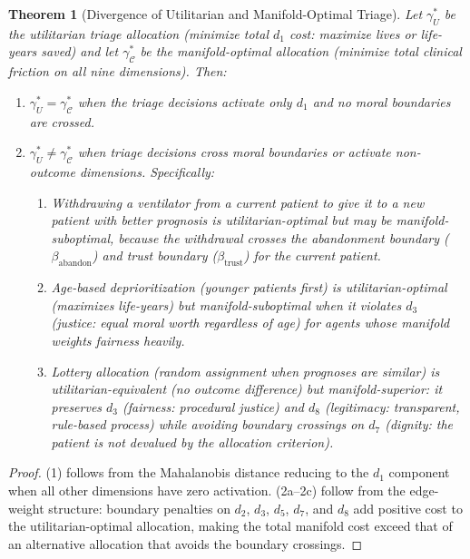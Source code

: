 \documentclass[12pt]{article}
\newtheorem{theorem}{Theorem}[section]
\theoremstyle{definition}
\theoremstyle{remark}
\newcommand{\C}{\mathcal{C}}               %
\begin{document}
\begin{theorem}[Divergence of Utilitarian and Manifold-Optimal Triage]
\label{thm:triage_divergence}
Let $\gamma_U^*$ be the utilitarian triage allocation (minimize total $d_1$ cost: maximize lives or life-years saved) and let $\gamma_\C^*$ be the manifold-optimal allocation (minimize total clinical friction on all nine dimensions).  Then:
\begin{enumerate}
    \item $\gamma_U^* = \gamma_\C^*$ when the triage decisions activate only $d_1$ and no moral boundaries are crossed.
    \item $\gamma_U^* \neq \gamma_\C^*$ when triage decisions cross moral boundaries or activate non-outcome dimensions.  Specifically:
    \begin{enumerate}
        \item Withdrawing a ventilator from a current patient to give it to a new patient with better prognosis is utilitarian-optimal but may be manifold-suboptimal, because the withdrawal crosses the abandonment boundary ($\beta_{\text{abandon}}$) and trust boundary ($\beta_{\text{trust}}$) for the current patient.
        \item Age-based deprioritization (younger patients first) is utilitarian-optimal (maximizes life-years) but manifold-suboptimal when it violates $d_3$ (justice: equal moral worth regardless of age) for agents whose manifold weights fairness heavily.
        \item Lottery allocation (random assignment when prognoses are similar) is utilitarian-equivalent (no outcome difference) but manifold-superior: it preserves $d_3$ (fairness: procedural justice) and $d_8$ (legitimacy: transparent, rule-based process) while avoiding boundary crossings on $d_7$ (dignity: the patient is not devalued by the allocation criterion).
    \end{enumerate}
\end{enumerate}
\end{theorem}

\begin{proof}
(1) follows from the Mahalanobis distance reducing to the $d_1$ component when all other dimensions have zero activation.  (2a--2c) follow from the edge-weight structure: boundary penalties on $d_2$, $d_3$, $d_5$, $d_7$, and $d_8$ add positive cost to the utilitarian-optimal allocation, making the total manifold cost exceed that of an alternative allocation that avoids the boundary crossings.
\end{proof}
\end{document}
